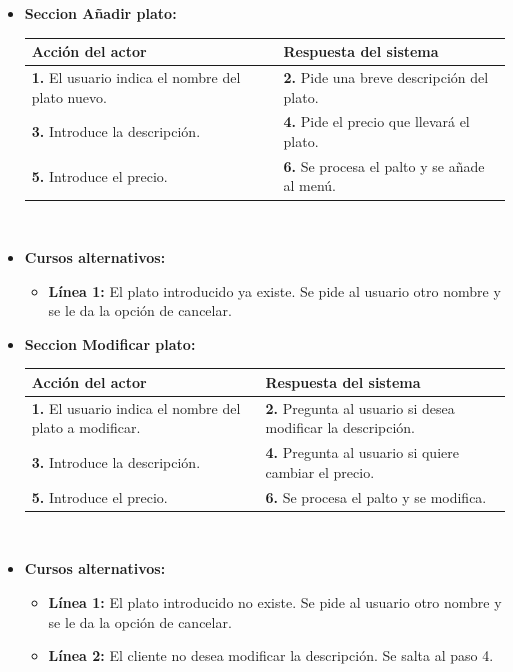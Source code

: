 \documentclass[spanish,a4paper,11pt, twoside]{report}	%
\begin{document}
\begin{itemize}
			\item \textbf{Seccion Añadir plato:} 	\\
				\begin{tabular}{|p{6cm}||p{6cm}|}
				\hline
				\textbf{Acción del actor} & \textbf{Respuesta del sistema} \\ \hline \hline
				\textbf{1.} El usuario indica el nombre del plato nuevo. & \textbf{2.} Pide una breve descripción del plato. \\ \hline
				\textbf{3.} Introduce la descripción.	& \textbf{4.} Pide el precio que llevará el plato. \\ \hline
				\textbf{5.} Introduce el precio. & \textbf{6.} Se procesa el palto y se añade al menú. \\ \hline
			\end{tabular}
			\\
			\item \textbf{Cursos alternativos:} 
			\begin{itemize}
			\item  \textbf{Línea 1:} El plato introducido ya existe. Se pide al usuario otro nombre y se le da la opción de cancelar.
			\end {itemize}
			
			\item \textbf{Seccion Modificar plato:} 	\\
				\begin{tabular}{|p{6cm}||p{6cm}|}
				\hline
				\textbf{Acción del actor} & \textbf{Respuesta del sistema} \\ \hline \hline
				\textbf{1.} El usuario indica el nombre del plato a modificar. & \textbf{2.} Pregunta al usuario si desea modificar la descripción. \\ \hline
				\textbf{3.} Introduce la descripción.	& \textbf{4.} Pregunta al usuario si quiere cambiar el precio. \\ \hline
				\textbf{5.} Introduce el precio. & \textbf{6.} Se procesa el palto y se modifica. \\ \hline
			\end{tabular}
			\\
			\item \textbf{Cursos alternativos:} 
			\begin{itemize}
			\item  \textbf{Línea 1:} El plato introducido no existe. Se pide al usuario otro nombre y se le da la opción de cancelar.
			\item  \textbf{Línea 2:} El cliente no desea modificar la descripción. Se salta al paso 4.


\end{itemize}
\end{itemize}
\end{document}
